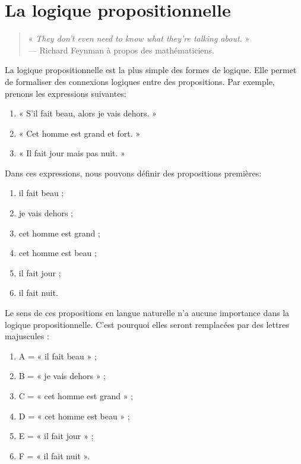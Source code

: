 
\chapter{La logique propositionnelle}

\begin{quote}
« \textit{\foreignlanguage{english}{They don't even need to know what they're
talking about.}} »\\--- Richard Feynman à propos des mathématiciens.
\end{quote}

La logique propositionnelle est la plus simple des formes de logique. Elle
permet de formaliser des connexions logiques entre des propositions.
Par exemple, prenons les expressions suivantes:

\begin{enumerate}
\item « S’il fait beau, alors je vais dehors. »
\item « Cet homme est grand et fort. »
\item « Il fait jour mais pas nuit. »
\end{enumerate}

Dans ces expressions, nous pouvons définir des propositions premières:

\begin{enumerate}
\item il fait beau ;
\item je vais dehors ;
\item cet homme est grand ;
\item cet homme est beau ;
\item il fait jour ;
\item il fait nuit.
\end{enumerate}

Le sens de ces propositions en langue naturelle n'a aucune importance
dans la logique propositionnelle. C'est
pourquoi elles seront remplacées par des lettres majuscules :

\begin{enumerate}
\item A = « il fait beau » ;
\item B = « je vais dehors » ;
\item C = « cet homme est grand » ;
\item D = « cet homme est beau » ;
\item E = « il fait jour » ;
\item F = « il fait nuit ».
\end{enumerate}

